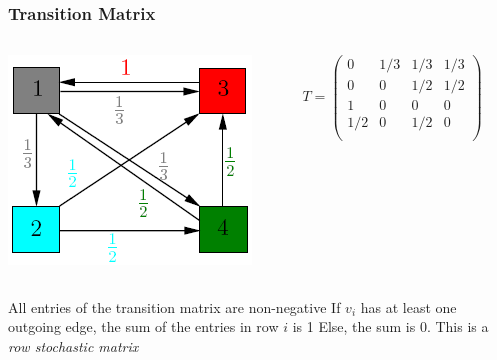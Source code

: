 \documentclass{beamer}
\begin{document}
\begin{frame}
\frametitle{Transition Matrix}
\begin{columns}
    \begin{column}{0.5\textwidth}
        \centering
        \includegraphics[width=\textwidth]{weighted.png}
    \end{column}
    \begin{column}{0.5\textwidth}
        \centering
        $T = \begin{pmatrix}
            0 & 1/3 & 1/3 & 1/3\\
            0 & 0 & 1/2 & 1/2\\
            1 & 0 & 0 & 0\\
            1/2 & 0 & 1/2 & 0\\
        \end{pmatrix}$
    \end{column}
\end{columns}
\begin{outline}
    \1 All entries of the transition matrix are non-negative
    \1 If $v_i$ has at least one outgoing edge, the sum of the entries in row $i$ is 1
        \2 Else, the sum is 0.
    \1 This is a \emph{row stochastic matrix}
\end{outline}
\end{frame}
\end{document}
